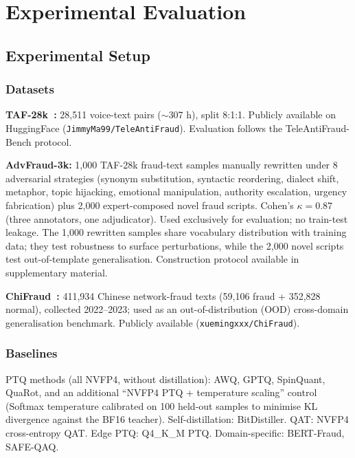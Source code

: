 \documentclass[lettersize,journal]{IEEEtran}
\begin{document}
\section{Experimental Evaluation}
\label{sec:experiments}

\subsection{Experimental Setup}
\label{sec:exp_setup}

\subsubsection{Datasets}

\textbf{TAF-28k~\cite{1}:} 28,511 voice-text pairs ($\sim$307 h),
split 8:1:1.  Publicly available on HuggingFace
(\texttt{JimmyMa99/TeleAntiFraud}).  Evaluation follows the
TeleAntiFraud-Bench protocol.

\textbf{AdvFraud-3k:} 1,000 TAF-28k fraud-text samples manually
rewritten under 8 adversarial strategies (synonym substitution,
syntactic reordering, dialect shift, metaphor, topic hijacking,
emotional manipulation, authority escalation, urgency fabrication)
plus 2,000 expert-composed novel fraud scripts.  Cohen's $\kappa =
0.87$ (three annotators, one adjudicator).  Used exclusively for
evaluation; no train-test leakage.  The 1,000 rewritten samples share
vocabulary distribution with training data; they test robustness to
surface perturbations, while the 2,000 novel scripts test
out-of-template generalisation.  Construction protocol available in
supplementary material.

\textbf{ChiFraud~\cite{chifraud}:} 411,934 Chinese network-fraud
texts (59,106 fraud + 352,828 normal), collected 2022--2023; used as
an out-of-distribution (OOD) cross-domain generalisation benchmark.
Publicly available (\texttt{xuemingxxx/ChiFraud}).

\subsubsection{Baselines}

PTQ methods (all NVFP4, without distillation): AWQ, GPTQ, SpinQuant,
QuaRot, and an additional ``NVFP4 PTQ + temperature scaling'' control
(Softmax temperature calibrated on 100 held-out samples to minimise
KL divergence against the BF16 teacher).  Self-distillation:
BitDistiller.  QAT: NVFP4 cross-entropy QAT.  Edge PTQ: Q4\_K\_M
PTQ.  Domain-specific: BERT-Fraud, SAFE-QAQ.
\end{document}
